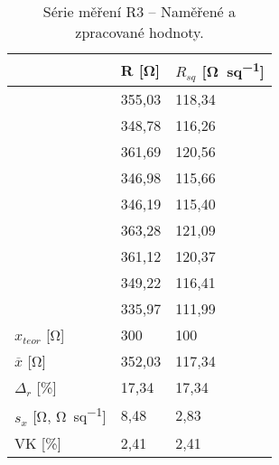 \begin{table}[h!]
    \caption{Série měření R3 -- Naměřené a zpracované hodnoty.}
    \centering
    \def\arraystretch{1.4}
    \begin{tabular}{l|l|l}
                                                      & R [\unit{\ohm}]    & \(R_{sq}\) [\unit{\ohm\per sq}]  \\ \hline\hline
                                                      & 355,03 & 118,34 \\ \hline
                                                      & 348,78 & 116,26 \\ \hline
                                                      & 361,69 & 120,56 \\ \hline
                                                      & 346,98 & 115,66 \\ \hline
                                                      & 346,19 & 115,40 \\ \hline
                                                      & 363,28 & 121,09 \\ \hline
                                                      & 361,12 & 120,37 \\ \hline
                                                      & 349,22 & 116,41 \\ \hline
                                                      & 335,97 & 111,99 \\ \hline\hline
        \(x_{teor} \) [\unit{\ohm}]                   & 300    & 100    \\ \hline
        \(\overline{x} \) [\unit{\ohm}]               & 352,03 & 117,34 \\ \hline
        \(\Delta_{r} \) [\unit{\percent}]             & 17,34& 17,34\\ \hline\hline
        \(s_{x} \) [\unit{\ohm}, \unit{\ohm\per sq}]  & 8,48   & 2,83   \\ \hline
        VK [\unit{\percent}]                          & 2,41 & 2,41 \\ 
    \end{tabular}
    \label{tab:r3_hodnoty}
\end{table}

